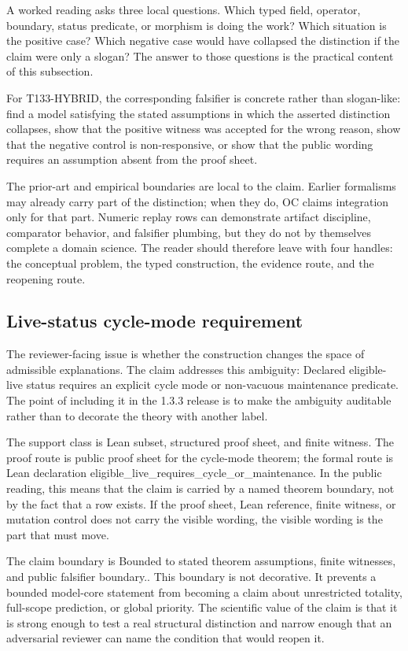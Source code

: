 A worked reading asks three local questions. Which typed field, operator, boundary, status predicate, or morphism is doing the work? Which situation is the positive case? Which negative case would have collapsed the distinction if the claim were only a slogan? The answer to those questions is the practical content of this subsection.

For T133-HYBRID, the corresponding falsifier is concrete rather than slogan-like: find a model satisfying the stated assumptions in which the asserted distinction collapses, show that the positive witness was accepted for the wrong reason, show that the negative control is non-responsive, or show that the public wording requires an assumption absent from the proof sheet.

The prior-art and empirical boundaries are local to the claim. Earlier formalisms may already carry part of the distinction; when they do, OC claims integration only for that part. Numeric replay rows can demonstrate artifact discipline, comparator behavior, and falsifier plumbing, but they do not by themselves complete a domain science. The reader should therefore leave with four handles: the conceptual problem, the typed construction, the evidence route, and the reopening route.

\subsection{Live-status cycle-mode requirement}
The reviewer-facing issue is whether the construction changes the space of admissible explanations. The claim addresses this ambiguity: Declared eligible-live status requires an explicit cycle mode or non-vacuous maintenance predicate. The point of including it in the 1.3.3 release is to make the ambiguity auditable rather than to decorate the theory with another label.

The support class is Lean subset, structured proof sheet, and finite witness. The proof route is public proof sheet for the cycle-mode theorem; the formal route is Lean declaration eligible\_live\_requires\_cycle\_or\_maintenance. In the public reading, this means that the claim is carried by a named theorem boundary, not by the fact that a row exists. If the proof sheet, Lean reference, finite witness, or mutation control does not carry the visible wording, the visible wording is the part that must move.

The claim boundary is Bounded to stated theorem assumptions, finite witnesses, and public falsifier boundary.. This boundary is not decorative. It prevents a bounded model-core statement from becoming a claim about unrestricted totality, full-scope prediction, or global priority. The scientific value of the claim is that it is strong enough to test a real structural distinction and narrow enough that an adversarial reviewer can name the condition that would reopen it.

